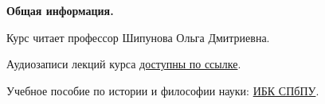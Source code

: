 \documentclass[main.tex]{subfiles}
\begin{document}
{\parindent0pt

\textbf{Общая информация.}

Курс читает профессор Шипунова Ольга Дмитриевна.

Аудиозаписи лекций курса \href{https://drive.google.com/drive/folders/1iSx2EjJJ98rhPpOsM4xGcJA7-7qitQHM?usp=sharing}{доступны по ссылке}.

Учебное пособие по истории и философии науки: \href{https://elib.spbstu.ru/dl/5/tr/2022/tr22-155.pdf/download/tr22-155.pdf}{ИБК СПбПУ}.

}
\end{document}
